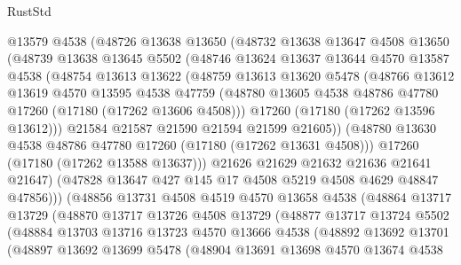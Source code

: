 \begin{lexlean}{RustStd}
\begin{coremodule}
          @13579
          @4538
          (@48726
            @13638
            @13650
            (@48732
              @13638
              @13647
              @4508
              @13650
              (@48739
                @13638
                @13645
                @5502
                (@48746
                  @13624
                  @13637
                  @13644
                  @4570
                  @13587
                  @4538
                  (@48754
                    @13613
                    @13622
                    (@48759
                      @13613
                      @13620
                      @5478
                      (@48766
                        @13612
                        @13619
                        @4570
                        @13595
                        @4538
                        @47759
                        (@48780 @13605 @4538 @48786 @47780 @17260 (@17180 (@17262 @13606 @4508)))
                        @17260
                        (@17180 (@17262 @13596 @13612)))
                      @21584
                      @21587
                      @21590
                      @21594
                      @21599
                      @21605))
                  (@48780 @13630 @4538 @48786 @47780 @17260 (@17180 (@17262 @13631 @4508)))
                  @17260
                  (@17180 (@17262 @13588 @13637)))
                @21626
                @21629
                @21632
                @21636
                @21641
                @21647)
              (@47828 @13647 @427 @145 @17 @4508 @5219 @4508 @4629 @48847 @47856)))
          (@48856
            @13731
            @4508
            @4519
            @4570
            @13658
            @4538
            (@48864
              @13717
              @13729
              (@48870
                @13717
                @13726
                @4508
                @13729
                (@48877
                  @13717
                  @13724
                  @5502
                  (@48884
                    @13703
                    @13716
                    @13723
                    @4570
                    @13666
                    @4538
                    (@48892
                      @13692
                      @13701
                      (@48897
                        @13692
                        @13699
                        @5478
                        (@48904
                          @13691
                          @13698
                          @4570
                          @13674
                          @4538

\end{coremodule}
\end{lexlean}
